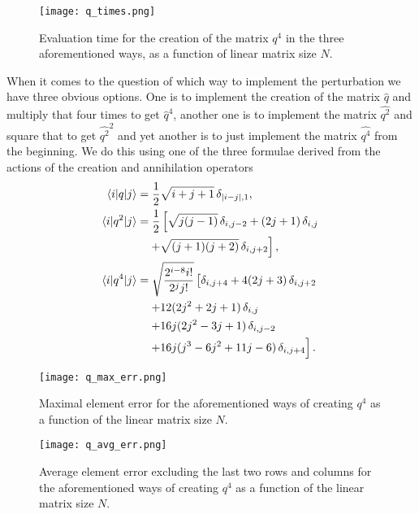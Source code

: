 \documentclass[10pt,a4paper,twocolumn]{article}
\begin{document}
\begin{figure}
\centering
\captionsetup{justification=centering}
\texttt{[image: q\_times.png]}
\caption{Evaluation time for the creation of the matrix $q^4$ in the three aforementioned ways, as a function of linear matrix size $N$.}
\label{fig:q_times}
\end{figure}

When it comes to the question of which way to implement the perturbation we have three obvious options. One is to implement the creation of the matrix $\widehat{q}$ and multiply that four times to get $\widehat{q}^4$, another one is to implement the matrix $\widehat{q^2}$ and square that to get $\widehat{q^2}^2$ and yet another is to just implement the matrix $\widehat{q^4}$ from the beginning. We do this using one of the three formulae derived from the actions of the creation and annihilation operators \cite{djg}
%
\begin{align}
\braket{i|q|j} &= \frac{1}{2} \sqrt{i+j+1}\, \delta_{|i-j|,1},\\
\braket{i|q^2|j} &= \frac{1}{2} \left[ \sqrt{j(j-1)} \, \delta_{i,j-2} + (2j+1) \, \delta_{i,j} \right.\notag\\
&\quad\left. + \sqrt{(j+1)(j+2)} \, \delta_{i,j+2} \right],\\
\braket{i|q^4|j} &= \sqrt{\frac{2^{i-8} i!}{2^j j!}} \left[ \delta_{i,j+4} + 4(2j+3)\, \delta_{i,j+2}\right.\notag\\
&\quad\left. + 12(2j^2+2j+1)\, \delta_{i,j}\right.\notag\\
&\quad\left. + 16j(2j^2-3j+1)\,\delta_{i,j-2}\right.\notag\\
&\quad\left. + 16j(j^3-6j^2+11j-6)\, \delta_{i,j+4} \right].
\end{align}

\begin{figure}
\centering
\captionsetup{justification=centering}
\texttt{[image: q\_max\_err.png]}
\caption{Maximal element error for the aforementioned ways of creating $q^4$ as a function of the linear matrix size $N$.}
\label{fig:q_max_err}
\end{figure}

\begin{figure}
\centering
\captionsetup{justification=centering}
\texttt{[image: q\_avg\_err.png]}
\caption{Average element error excluding the last two rows and columns for the aforementioned ways of creating $q^4$ as a function of the linear matrix size $N$.}
\label{fig:q_avg_err}
\end{figure}
\end{document}
